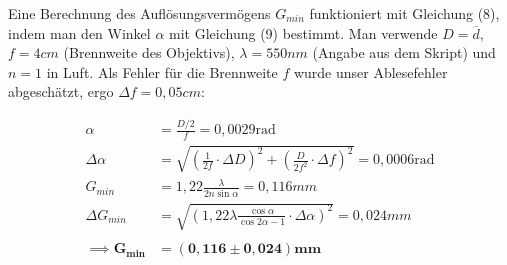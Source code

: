 \documentclass{article}
\begin{document}




 
Eine Berechnung des Auflösungsvermögens $G_{min}$ funktioniert mit Gleichung (8), indem man den Winkel $\alpha$ mit Gleichung (9) bestimmt. Man verwende $D = \overline{d}$, $f = 4cm$ (Brennweite des Objektivs), $\lambda = 550nm$ (Angabe aus dem Skript) und $n=1$ in Luft. Als Fehler für die Brennweite $f$ wurde unser Ablesefehler abgeschätzt, ergo $\Delta f = 0,05cm$:

\begin{equation}
    \begin{split}
        \alpha &= \frac{D/2}{f} = 0,0029 \text{rad} \\
        \Delta \alpha &=  \sqrt{\left( \frac{1}{2f} \cdot \Delta D \right)^2 + \left( \frac{D}{2f^2} \cdot \Delta f \right)^2} = 0,0006 \text{rad} \\
        G_{min} &= 1,22 \frac{\lambda}{2n \sin{\alpha}} = 0,116mm \\
        \Delta G_{min} &= \sqrt{\left( 1,22 \lambda \frac{\cos{\alpha}}{\cos{2 \alpha} - 1} \cdot \Delta \alpha \right)^2} = 0,024mm \\ \\
        \implies \bm{G_{min}} &= \bm{(0,116 \pm 0,024)mm}
    \end{split}
\end{equation}
\end{document}
